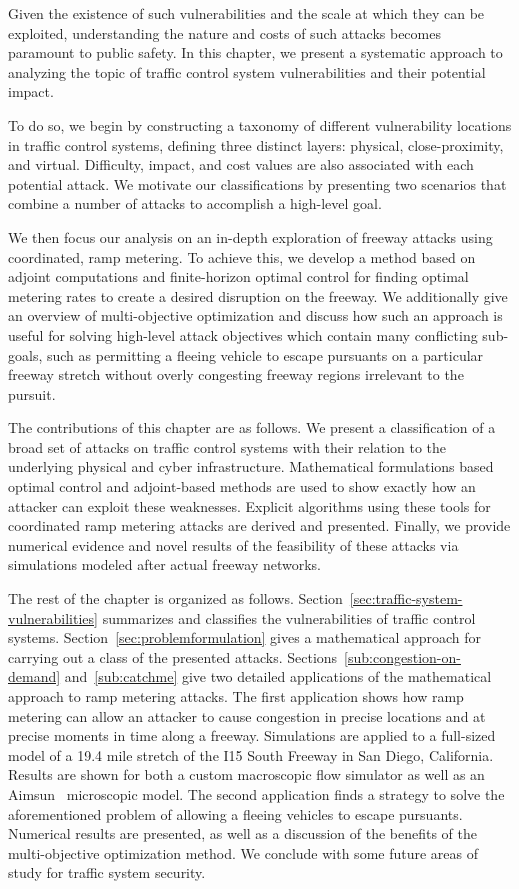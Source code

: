 Given the existence of such vulnerabilities and the scale at which they can be exploited, understanding the nature and costs of such attacks becomes paramount to public safety. In this chapter, we present a systematic approach to analyzing the topic of traffic control system vulnerabilities and their potential impact.

To do so, we begin by constructing a taxonomy of different vulnerability locations in traffic control systems, defining three distinct layers: physical, close-proximity, and virtual. Difficulty, impact, and cost values are also associated with each potential attack.  We motivate our classifications by presenting two scenarios that combine a number of attacks to accomplish a high-level goal.

We then focus our analysis on an in-depth exploration of freeway attacks using coordinated, ramp metering. To achieve this, we develop a method based on adjoint computations and finite-horizon optimal control for finding optimal metering rates to create a desired disruption on the freeway. We additionally give an overview of multi-objective optimization and discuss how such an approach is useful for solving high-level attack objectives which contain many conflicting sub-goals, such as permitting a fleeing vehicle to escape pursuants on a particular freeway stretch without overly congesting freeway regions irrelevant to the pursuit.

The contributions of this chapter are as follows. We present a classification of a broad set of attacks on traffic control systems with their relation to the underlying physical and cyber infrastructure. Mathematical formulations based optimal control and adjoint-based methods are used to show exactly how an attacker can exploit these weaknesses. Explicit algorithms using these tools for coordinated ramp metering attacks are derived and presented. Finally, we provide numerical evidence and novel results of the feasibility of these attacks via simulations modeled after actual freeway networks.

The rest of the chapter is organized as follows. Section~\ref{sec:traffic-system-vulnerabilities} summarizes and classifies the vulnerabilities of traffic control systems. Section~\ref{sec:problemformulation} gives a mathematical approach for carrying out a class of the presented attacks.  Sections~\ref{sub:congestion-on-demand} and~\ref{sub:catchme} give two detailed applications of the mathematical approach to ramp metering attacks. The first application shows how ramp metering can allow an attacker to cause congestion in precise locations and at precise moments in time along a freeway. Simulations are applied to a full-sized model of a 19.4 mile stretch of the I15 South Freeway in San Diego, California. Results are shown for both a custom macroscopic flow simulator as well as an Aimsun~\cite{barcelo2001microscopic} microscopic model. The second application finds a strategy to solve the aforementioned problem of allowing a fleeing vehicles to escape pursuants. Numerical results are presented, as well as a discussion of the benefits of the multi-objective optimization method. We conclude with some future areas of study for traffic system security.


